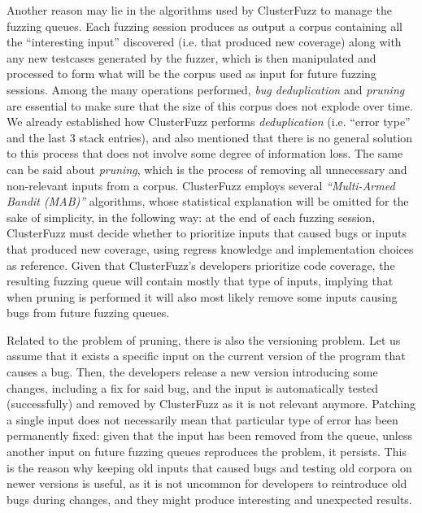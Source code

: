 Another reason may lie in the algorithms used by ClusterFuzz to manage the fuzzing queues. Each fuzzing session produces as output a corpus containing all the ``interesting input'' discovered (i.e. that produced new coverage) along with any new testcases generated by the fuzzer, which is then manipulated and processed to form what will be the corpus used as input for future fuzzing sessions. Among the many operations performed, \textit{bug deduplication} and \textit{pruning} are essential to make sure that the size of this corpus does not explode over time. We already established how ClusterFuzz performs \textit{deduplication} (i.e. ``error type'' and the last 3 stack entries), and also mentioned that there is no general solution to this process that does not involve some degree of information loss.
The same can be said about \textit{pruning}, which is the process of removing all unnecessary and non-relevant inputs from a corpus. ClusterFuzz employs several \textit{``Multi-Armed Bandit (MAB)''} \cite{mab} algorithms, whose statistical explanation will be omitted for the sake of simplicity, in the following way: at the end of each fuzzing session, ClusterFuzz must decide whether to prioritize inputs that caused bugs or inputs that produced new coverage, using regress knowledge and implementation choices as reference. Given that ClusterFuzz's developers prioritize code coverage, the resulting fuzzing queue will contain mostly that type of inputs, implying that when pruning is performed it will also most likely remove some inputs causing bugs from future fuzzing queues.

Related to the problem of pruning, there is also the versioning problem.
Let us assume that it exists a specific input on the current version of the program that causes a bug. Then, the developers release a new version introducing some changes, including a fix for said bug, and the input is automatically tested (successfully) and removed by ClusterFuzz as it is not relevant anymore. Patching a single input does not necessarily mean that particular type of error has been permanently fixed: given that the input has been removed from the queue, unless another input on future fuzzing queues reproduces the problem, it persists. This is the reason why keeping old inputs that caused bugs and testing old corpora on newer versions is useful, as it is not uncommon for developers to reintroduce old bugs during changes, and they might produce interesting and unexpected results.

